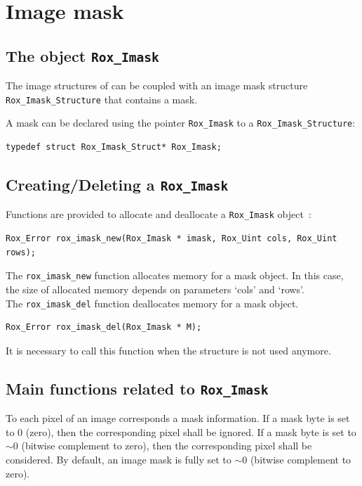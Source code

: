 \section{Image mask}
\label{sec:imask}

\subsection{The object {\tt Rox\_Imask}}
\label{sse:imask_object}

The image structures of {\bf \rox} can be coupled with an image mask structure \lstinline$Rox_Imask_Structure$ that contains a mask. %

A mask can be declared using the pointer \lstinline$Rox_Imask$ to a \lstinline$Rox_Imask_Structure$:
 
\begin{lstlisting}
typedef struct Rox_Imask_Struct* Rox_Imask;
\end{lstlisting}

\subsection{Creating/Deleting a {\tt Rox\_Imask}}
\label{sse:creating_imask}
Functions are provided to allocate and deallocate a \lstinline$Rox_Imask$ object~:

\begin{lstlisting}
Rox_Error rox_imask_new(Rox_Imask * imask, Rox_Uint cols, Rox_Uint rows);
\end{lstlisting}
The \lstinline$rox_imask_new$ function allocates memory for a mask object. In this case, the size of allocated memory depends on parameters `cols' and `rows'.\\ 

The \lstinline$rox_imask_del$ function deallocates memory for a mask object. 
\begin{lstlisting}
Rox_Error rox_imask_del(Rox_Imask * M);
\end{lstlisting}
It is necessary to call this function when the structure is not used anymore.

\subsection{Main functions related to {\tt Rox\_Imask}}
\label{sse:imask_methods}

To each pixel of an image corresponds a mask information. If a mask byte is set to 0 (zero), then the corresponding pixel shall be ignored. If a mask byte is set to $\sim$0 (bitwise complement to zero), then the corresponding pixel shall be considered.  By default, an image mask is fully set to  $\sim$0 (bitwise complement to zero). \\

